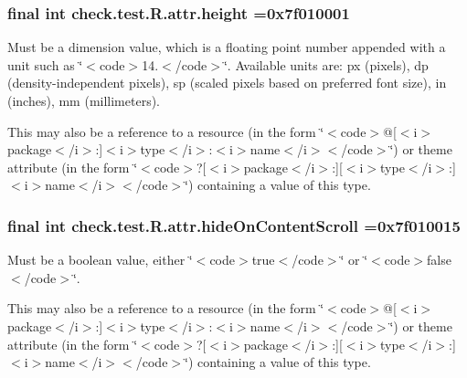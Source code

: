 \subsubsection[{height}]{\setlength{\rightskip}{0pt plus 5cm}final int check.\+test.\+R.\+attr.\+height =0x7f010001\hspace{0.3cm}{\ttfamily [static]}}\label{classcheck_1_1test_1_1_r_1_1attr_ad0373977141facd56b9a985852b9a5c4}
Must be a dimension value, which is a floating point number appended with a unit such as \char`\"{}$<$code$>$14.\+5sp$<$/code$>$\char`\"{}. Available units are\+: px (pixels), dp (density-\/independent pixels), sp (scaled pixels based on preferred font size), in (inches), mm (millimeters). 

This may also be a reference to a resource (in the form \char`\"{}$<$code$>$@\mbox{[}$<$i$>$package$<$/i$>$\+:\mbox{]}$<$i$>$type$<$/i$>$\+:$<$i$>$name$<$/i$>$$<$/code$>$\char`\"{}) or theme attribute (in the form \char`\"{}$<$code$>$?\mbox{[}$<$i$>$package$<$/i$>$\+:\mbox{]}\mbox{[}$<$i$>$type$<$/i$>$\+:\mbox{]}$<$i$>$name$<$/i$>$$<$/code$>$\char`\"{}) containing a value of this type. \hypertarget{classcheck_1_1test_1_1_r_1_1attr_ae2d6e7290f2cd4974b305b03b1f5f329}{}
\subsubsection[{hide\+On\+Content\+Scroll}]{\setlength{\rightskip}{0pt plus 5cm}final int check.\+test.\+R.\+attr.\+hide\+On\+Content\+Scroll =0x7f010015\hspace{0.3cm}{\ttfamily [static]}}\label{classcheck_1_1test_1_1_r_1_1attr_ae2d6e7290f2cd4974b305b03b1f5f329}
Must be a boolean value, either \char`\"{}$<$code$>$true$<$/code$>$\char`\"{} or \char`\"{}$<$code$>$false$<$/code$>$\char`\"{}. 

This may also be a reference to a resource (in the form \char`\"{}$<$code$>$@\mbox{[}$<$i$>$package$<$/i$>$\+:\mbox{]}$<$i$>$type$<$/i$>$\+:$<$i$>$name$<$/i$>$$<$/code$>$\char`\"{}) or theme attribute (in the form \char`\"{}$<$code$>$?\mbox{[}$<$i$>$package$<$/i$>$\+:\mbox{]}\mbox{[}$<$i$>$type$<$/i$>$\+:\mbox{]}$<$i$>$name$<$/i$>$$<$/code$>$\char`\"{}) containing a value of this type. \hypertarget{classcheck_1_1test_1_1_r_1_1attr_ac56c15568d0c8ec982363888f65d9c17}{}
